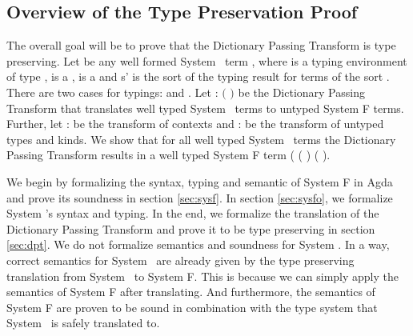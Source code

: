 \subsection{Overview of the Type Preservation Proof}\label{sec:ov}
The overall goal will be to prove that the Dictionary Passing Transform is type preserving. 
Let  be any well formed System \Fo\ term    \Constr{:} , where  is a typing environment of type ,  is a  ,  is a   and s' is the sort of the typing result for terms of the sort . 
There are two cases for typings:    \Constr{:}  and    \Constr{:} .
Let  : $($   \Constr{:} $)$    be the Dictionary Passing Transform that translates well typed System \Fo\ terms to untyped System F terms. 
Further, let  :    be the transform of contexts and  :      be the transform of untyped types and kinds. 
We show that for all well typed System \Fo\  terms  the Dictionary Passing Transform results in a well typed System F term (   ( ) \Constr{:} ( ). 

\noindent We begin by formalizing the syntax, typing and semantic of System F in Agda and prove its soundness in section \ref{sec:sysf}. 
In section \ref{sec:sysfo}, we formalize System \Fo's syntax and typing. 
In the end, we formalize the translation of the Dictionary Passing Transform and prove it to be type preserving in section \ref{sec:dpt}. 
We do not formalize semantics and soundness for System \Fo. 
In a way, correct semantics for System \Fo\ are already given by the type preserving translation from System \Fo\ to System F. 
This is because we can simply apply the semantics of System F after translating. 
And furthermore, the semantics of System F are proven to be sound in combination with the type system that System \Fo\ is safely translated to.